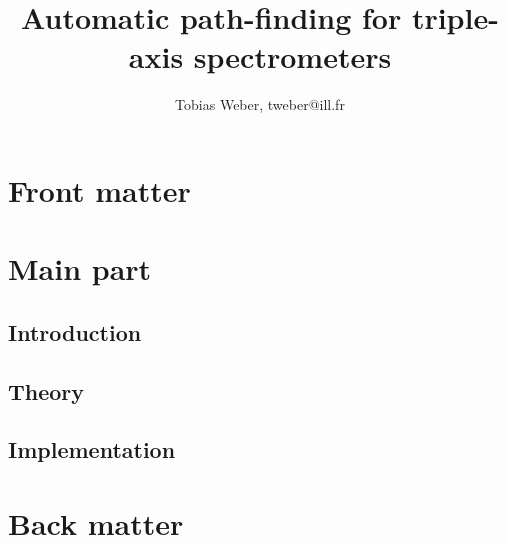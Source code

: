 \documentclass[english, 11pt]{book}
\begin{document}
\newcommand{\ill}{Institut Laue-Langevin (ILL), 71 avenue des Martyrs, CS 20156, 38042 Grenoble cedex 9, France}
\newcommand{\fuh}{Fernuniversit\"at in Hagen (FUH), Universit\"atsstraße 47, 58097 Hagen, Germany}


\title{Automatic path-finding for triple-axis spectrometers}
\author{Tobias Weber, tweber@ill.fr}

\maketitle
\tableofcontents




\part{Front matter}




\part{Main part}

\chapter{Introduction}


\chapter{Theory}




\chapter{Implementation}


\appendix
\part{Back matter}





\end{document}
